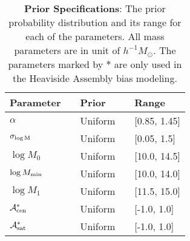 \documentclass[14pt, preprint]{emulateapj}
\newcommand{\mzero}{\log M_{0}}
\newcommand{\mone}{\log M_{1}}
\newcommand{\mmin}{\log M_{\rm min}}
\newcommand{\sigmam}{\sigma_{\log \rm M}}
\newcommand{\acen}{\mathcal{A}_{\rm cen}}
\newcommand{\asat}{\mathcal{A}_{\rm sat}}
\begin{document}
\begin{table*}
\begin{center}
  \label{tab:prior}
  \caption{{\bf Prior Specifications}: The prior probability distribution 
  and its range for each of the parameters. 
  All mass parameters are in unit of $h^{-1}M_\odot$. The parameters marked by $*$ are only used in the Heaviside Assembly bias modeling.}
\begin{tabular}{@{}lllll}
\\ \hline 
    Parameter & & Prior & & Range \\ \hline
  $\alpha$ & & Uniform & & [0.85, 1.45] \\
  $\sigmam$ & & Uniform & &  [0.05, 1.5] \\
   $\mzero$   & & Uniform & &  [10.0, 14.5] \\
  $\mmin$ & &   Uniform & &  [10.0, 14.0] \\
  $\mone$ & & Uniform & & [11.5, 15.0] \\ 
  $\acen^{*}$ & & Uniform & & [-1.0, 1.0] \\
  $\asat^{*}$ & & Uniform & & [-1.0, 1.0] \\
 \hline
  \end{tabular}
\end{center}
\end{table*}
\end{document}
